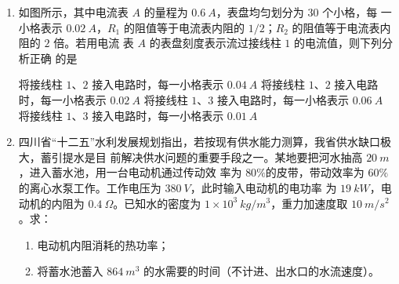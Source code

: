 \begin{enumerate}
\item 
{}
如图所示，其中电流表 $ A $ 的量程为 $ 0.6 \ A $，表盘均匀划分为 $ 30 $ 个小格，每
一小格表示 $ 0.02 \ A $，$ R_{1} $ 的阻值等于电流表内阻的 $ 1/2 $；$ R_{2} $ 的阻值等于电流表内阻的 $ 2 $ 倍。若用电流
表 $ A $ 的表盘刻度表示流过接线柱 $ 1 $ 的电流值，则下列分析正确
的是  
\begin{figure}[h!]
\centering

\end{figure}


\fourchoices
{将接线柱 $ 1 $、$ 2 $ 接入电路时，每一小格表示 $ 0.04 \ A $}
{将接线柱 $ 1 $、$ 2 $ 接入电路时，每一小格表示 $ 0.02 \ A $}
{将接线柱 $ 1 $、$ 3 $ 接入电路时，每一小格表示 $ 0.06 \ A $}
{将接线柱 $ 1 $、$ 3 $ 接入电路时，每一小格表示 $ 0.01 \ A $}




\item 
{}
四川省“十二五”水利发展规划指出，若按现有供水能力测算，我省供水缺口极大，蓄引提水是目
前解决供水问题的重要手段之一。某地要把河水抽高 $ 20 \ m $，进入蓄水池，用一台电动机通过传动效
率为 $ 80 \% $的皮带，带动效率为 $ 60 \% $的离心水泵工作。工作电压为 $ 380 \ V $，此时输入电动机的电功率
为 $ 19 \ kW $，电动机的内阻为 $ 0.4 \ \Omega $。已知水的密度为 $ 1 \times 10^{3} \ kg/m^{3} $，重力加速度取 $ 10 \ m/s^{2} $。求：
\begin{enumerate}
\item
电动机内阻消耗的热功率；

\item 
将蓄水池蓄入 $ 864 \ m^{3} $ 的水需要的时间（不计进、出水口的水流速度）。



\end{enumerate}






\end{enumerate}
